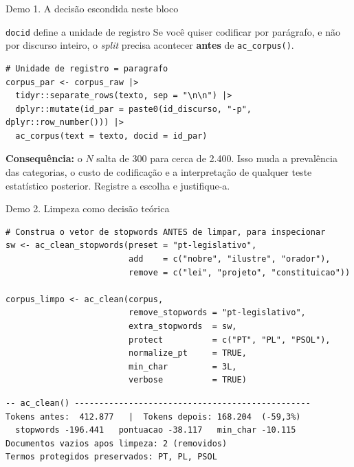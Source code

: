 \documentclass[11pt,aspectratio=169]{beamer}
\begin{document}
\begin{frame}[fragile]{Demo 1. A decisão escondida neste bloco}
\begin{block}{\texttt{docid} define a unidade de registro}
Se você quiser codificar por parágrafo, e não por discurso inteiro, o
\emph{split} precisa acontecer \textbf{antes} de \texttt{ac\_corpus()}.
\end{block}
\vspace{0.35cm}
\begin{lstlisting}
# Unidade de registro = paragrafo
corpus_par <- corpus_raw |>
  tidyr::separate_rows(texto, sep = "\n\n") |>
  dplyr::mutate(id_par = paste0(id_discurso, "-p", dplyr::row_number())) |>
  ac_corpus(text = texto, docid = id_par)
\end{lstlisting}
\vspace{0.2cm}
\footnotesize \textbf{Consequência:} o $N$ salta de 300 para cerca de 2.400.
Isso muda a prevalência das categorias, o custo de codificação e a
interpretação de qualquer teste estatístico posterior. Registre a escolha e
justifique-a.
\end{frame}

\begin{frame}[fragile]{Demo 2. Limpeza como decisão teórica}
\begin{lstlisting}
# Construa o vetor de stopwords ANTES de limpar, para inspecionar
sw <- ac_clean_stopwords(preset = "pt-legislativo",
                         add    = c("nobre", "ilustre", "orador"),
                         remove = c("lei", "projeto", "constituicao"))

corpus_limpo <- ac_clean(corpus,
                         remove_stopwords = "pt-legislativo",
                         extra_stopwords  = sw,
                         protect          = c("PT", "PL", "PSOL"),
                         normalize_pt     = TRUE,
                         min_char         = 3L,
                         verbose          = TRUE)
\end{lstlisting}
\begin{lstlisting}[style=Rsaida]
-- ac_clean() ------------------------------------------------
Tokens antes:  412.877   |  Tokens depois: 168.204  (-59,3%)
  stopwords -196.441   pontuacao -38.117   min_char -10.115
Documentos vazios apos limpeza: 2 (removidos)
Termos protegidos preservados: PT, PL, PSOL
\end{lstlisting}
\end{frame}
\end{document}
